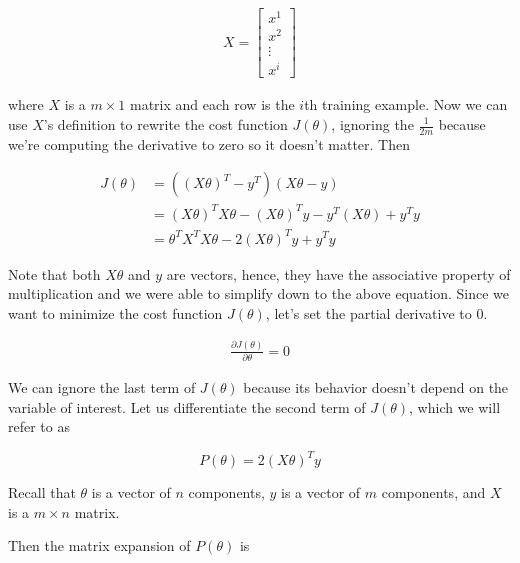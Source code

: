 \begin{align*}
    X =
    \begin{bmatrix}
        x^1 \\
        x^2 \\
        \vdots \\
        x^i
    \end{bmatrix}
\end{align*}

\noindent where $X$ is a $m\times 1$ matrix and each row is the $i$th training example. Now we can use
$X$'s definition to rewrite the cost function $J(\theta)$, ignoring the $\frac{1}{2m}$ because we're
computing the derivative to zero so it doesn't matter. Then

\begin{align*}
    J(\theta) &= ((X\theta)^T-y^T)(X\theta-y) \\
    &= (X\theta)^T X\theta - (X\theta)^T y - y^T(X\theta) + y^T y \\
    &= \theta^T X^T X\theta-2(X\theta)^T y+y^T y
\end{align*}

\noindent Note that both $X\theta$ and $y$ are vectors, hence, they have the associative property of
multiplication and we were able to simplify down to the above equation. Since we want to minimize the
cost function $J(\theta)$, let's set the partial derivative to 0.

\begin{align*}
    \frac{\partial J(\theta)}{\partial\theta}  = 0
\end{align*}

\noindent We can ignore the last term of $J(\theta)$ because its behavior doesn't depend on the variable
of interest. Let us differentiate the second term of $J(\theta)$, which we will refer to as

\begin{equation*}
    P(\theta) = 2(X\theta)^T y
\end{equation*}

\noindent Recall that $\theta$ is a vector of $n$ components, $y$ is a vector of $m$ components, and
$X$ is a $m\times n$ matrix.

\noindent Then the matrix expansion of $P(\theta)$ is

